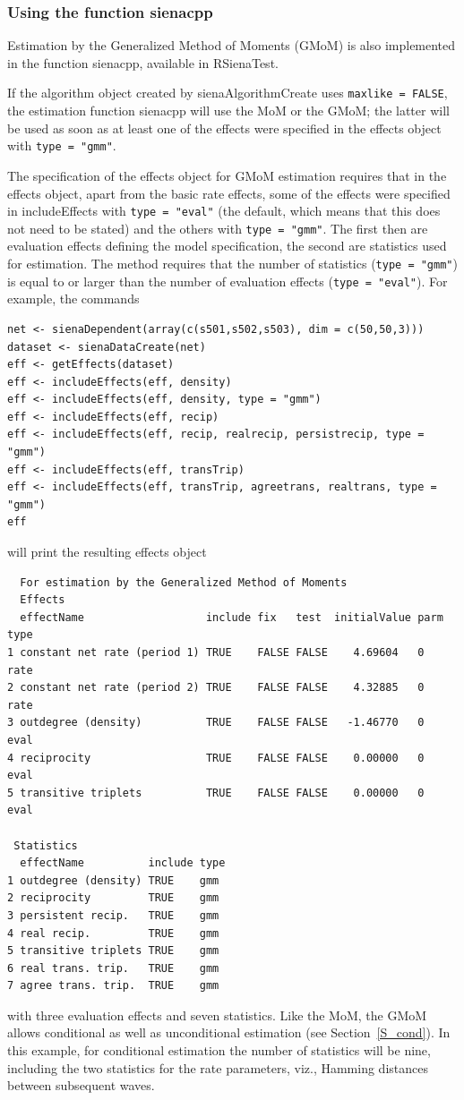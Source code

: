 \documentclass[a4paper,fleqn,11pt]{article}
\newcommand{\+}{\, + \,}
\newcommand{\sfn}[1]{\textsf{#1}}
\begin{document}
\subsubsection{Using the function \sfn{sienacpp}}
\label{S_GMoM_sienacpp}

Estimation by the Generalized Method of Moments (GMoM) is also implemented
in the function \sfn{sienacpp}, available in \sfn{RSienaTest}.

If the algorithm object created by \sfn{sienaAlgorithmCreate}
uses \texttt{maxlike = FALSE}, the estimation function \sfn{sienacpp}
will use the MoM or the GMoM; the latter will be used as soon as
at least one of the effects were specified in the effects object with
\texttt{type = "gmm"}.

The specification of the effects object for GMoM estimation requires
that in the effects object, apart from the basic rate effects,
some of the effects were specified
in  \sfn{includeEffects} with \texttt{type = "eval"}
(the default, which means that this does not need to be stated)
and the others with \texttt{type = "gmm"}.
The first then are evaluation effects defining the model specification,
the second are statistics used for estimation.
The method requires that the number of statistics (\texttt{type = "gmm"})
is equal to or larger than the number of
evaluation effects (\texttt{type = "eval"}).
For example, the commands

\begin{verbatim}
net <- sienaDependent(array(c(s501,s502,s503), dim = c(50,50,3)))
dataset <- sienaDataCreate(net)
eff <- getEffects(dataset)
eff <- includeEffects(eff, density)
eff <- includeEffects(eff, density, type = "gmm")
eff <- includeEffects(eff, recip)
eff <- includeEffects(eff, recip, realrecip, persistrecip, type = "gmm")
eff <- includeEffects(eff, transTrip)
eff <- includeEffects(eff, transTrip, agreetrans, realtrans, type = "gmm")
eff
\end{verbatim}
will print the resulting effects object
\begin{verbatim}
  For estimation by the Generalized Method of Moments
  Effects
  effectName                   include fix   test  initialValue parm type
1 constant net rate (period 1) TRUE    FALSE FALSE    4.69604   0    rate
2 constant net rate (period 2) TRUE    FALSE FALSE    4.32885   0    rate
3 outdegree (density)          TRUE    FALSE FALSE   -1.46770   0    eval
4 reciprocity                  TRUE    FALSE FALSE    0.00000   0    eval
5 transitive triplets          TRUE    FALSE FALSE    0.00000   0    eval

 Statistics
  effectName          include type
1 outdegree (density) TRUE    gmm
2 reciprocity         TRUE    gmm
3 persistent recip.   TRUE    gmm
4 real recip.         TRUE    gmm
5 transitive triplets TRUE    gmm
6 real trans. trip.   TRUE    gmm
7 agree trans. trip.  TRUE    gmm
\end{verbatim}
with three evaluation effects and seven statistics.
Like the MoM, the GMoM allows conditional as well as unconditional
estimation (see Section~\ref{S_cond}).
In this example, for conditional estimation the number
of statistics will be nine, including the two statistics
for the rate parameters, viz., Hamming distances
between subsequent waves.
\end{document}

